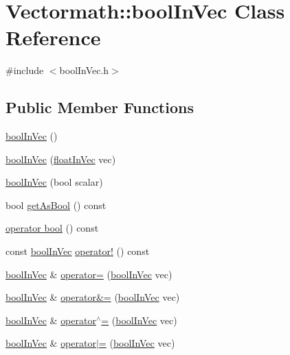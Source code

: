 \hypertarget{classVectormath_1_1boolInVec}{\section{Vectormath\-:\-:bool\-In\-Vec Class Reference}
\label{classVectormath_1_1boolInVec}
}


{\ttfamily \#include $<$bool\-In\-Vec.\-h$>$}

\subsection*{Public Member Functions}
\begin{DoxyCompactItemize}
\item 
\hyperlink{classVectormath_1_1boolInVec_a846273f80c565698980f5840f73e61d3}{bool\-In\-Vec} ()
\item 
\hyperlink{classVectormath_1_1boolInVec_aa21ebe5fd4b82622482071def03bf027}{bool\-In\-Vec} (\hyperlink{classVectormath_1_1floatInVec}{float\-In\-Vec} vec)
\item 
\hyperlink{classVectormath_1_1boolInVec_a4f28ddfcc232b287446eb659b2c5f326}{bool\-In\-Vec} (bool scalar)
\item 
bool \hyperlink{classVectormath_1_1boolInVec_a817030f4550f00989173939aaafb5958}{get\-As\-Bool} () const 
\item 
\hyperlink{classVectormath_1_1boolInVec_a258f20bcd56f284843a5e4a0964af02a}{operator bool} () const 
\item 
const \hyperlink{classVectormath_1_1boolInVec}{bool\-In\-Vec} \hyperlink{classVectormath_1_1boolInVec_aba21c8c76cb386b1d6b2c38cdabd2336}{operator!} () const 
\item 
\hyperlink{classVectormath_1_1boolInVec}{bool\-In\-Vec} \& \hyperlink{classVectormath_1_1boolInVec_a2c50cda65cc64eb8a72ccab7fc4ad88d}{operator=} (\hyperlink{classVectormath_1_1boolInVec}{bool\-In\-Vec} vec)
\item 
\hyperlink{classVectormath_1_1boolInVec}{bool\-In\-Vec} \& \hyperlink{classVectormath_1_1boolInVec_a2a14f17fa25b360c5984c491d121f446}{operator\&=} (\hyperlink{classVectormath_1_1boolInVec}{bool\-In\-Vec} vec)
\item 
\hyperlink{classVectormath_1_1boolInVec}{bool\-In\-Vec} \& \hyperlink{classVectormath_1_1boolInVec_ac053a8e6fee07110c9b1e963b145d47c}{operator$^\wedge$=} (\hyperlink{classVectormath_1_1boolInVec}{bool\-In\-Vec} vec)
\item 
\hyperlink{classVectormath_1_1boolInVec}{bool\-In\-Vec} \& \hyperlink{classVectormath_1_1boolInVec_ae47bc0c7ee817a201a9006b3ca99102f}{operator$\vert$=} (\hyperlink{classVectormath_1_1boolInVec}{bool\-In\-Vec} vec)
\end{DoxyCompactItemize}


